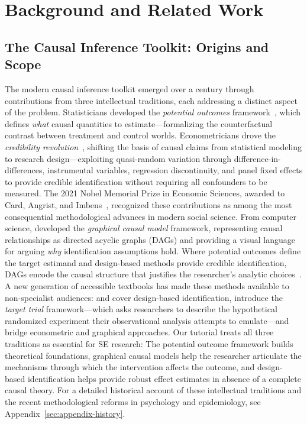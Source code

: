 \section{Background and Related Work}
\label{sec:background}

\subsection{The Causal Inference Toolkit: Origins and Scope}
\label{sec:bg-causal-history}

The modern causal inference toolkit emerged over a century through contributions from three intellectual traditions, each addressing a distinct aspect of the problem.
Statisticians developed the \emph{potential outcomes} framework~\cite{neyman1923application, rubin1974estimating}, which defines \emph{what} causal quantities to estimate---formalizing the counterfactual contrast between treatment and control worlds.
Econometricians drove the \emph{credibility revolution}~\cite{angrist2010credibility}, shifting the basis of causal claims from statistical modeling to research design---exploiting quasi-random variation through difference-in-differences, instrumental variables, regression discontinuity, and panel fixed effects to provide credible identification without requiring all confounders to be measured.
The 2021 Nobel Memorial Prize in Economic Sciences, awarded to Card, Angrist, and Imbens~\cite{nobelprize2021economics}, recognized these contributions as among the most consequential methodological advances in modern social science.
From computer science, \citet{pearl2009causality} developed the \emph{graphical causal model} framework, representing causal relationships as directed acyclic graphs (DAGs) and providing a visual language for arguing \emph{why} identification assumptions hold.
Where potential outcomes define the target estimand and design-based methods provide credible identification, DAGs encode the causal structure that justifies the researcher's analytic choices~\cite{morgan2015counterfactuals, imbens2020potential}.
A new generation of accessible textbooks has made these methods available to non-specialist audiences: \citet{angrist2009mostly} and \citet{cunningham2021causal} cover design-based identification, \citet{hernan2020causal} introduce the \emph{target trial} framework---which asks researchers to describe the hypothetical randomized experiment their observational analysis attempts to emulate---and \citet{huntingtonklein2021effect} bridge econometric and graphical approaches.
Our tutorial treats all three traditions as essential for SE research: The potential outcome framework builds theoretical foundations, graphical causal models help the researcher articulate the mechanisms through which the intervention affects the outcome, and design-based identification helps provide robust effect estimates in absence of a complete causal theory.
For a detailed historical account of these intellectual traditions and the recent methodological reforms in psychology and epidemiology, see Appendix~\ref{sec:appendix-history}.

